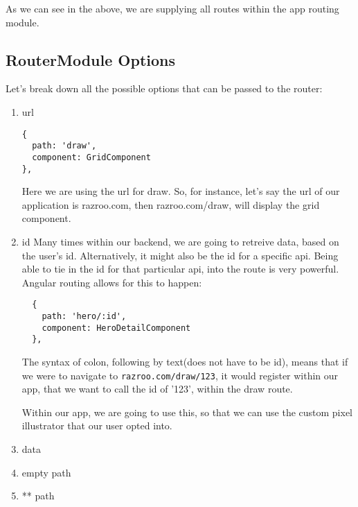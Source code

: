As we can see in the above, we are supplying all routes within the app routing
module.

\subsection{ RouterModule Options }
Let's break down all the possible options that can be passed to the router:
\begin{enumerate}
  \item url
    \begin{lstlisting}
{
  path: 'draw',
  component: GridComponent
},
    \end{lstlisting}
    Here we are using the url for draw. So, for instance, let's say the url
    of our application is razroo.com, then razroo.com/draw, will display
    the grid component.
  \item id
  Many times within our backend, we are going to retreive data, based on the 
  user's id. Alternatively, it might also be the id for a specific api. Being
  able to tie in the id for that particular api, into the route is very 
  powerful. Angular routing allows for this to happen: 
  \begin{lstlisting}
  { 
    path: 'hero/:id', 
    component: HeroDetailComponent 
  },
  \end{lstlisting}
  The syntax of colon, following by text(does not have to be id), means that 
  if we were to navigate to \lstinline{razroo.com/draw/123}, it would 
  register within our app, that we want to call the id of '123', within
  the draw route. 

  Within our app, we are going to use this, so that we can use the custom 
  pixel illustrator that our user opted into. 
  \item data
  \item empty path
  \item ** path
\end{enumerate}
